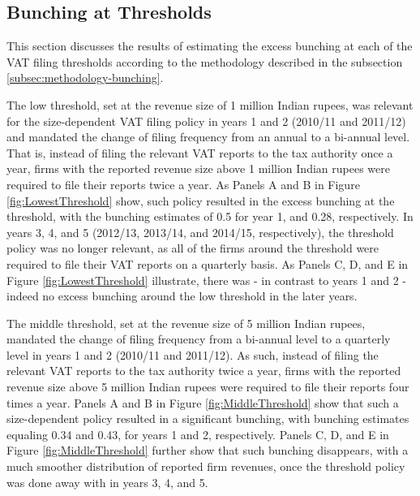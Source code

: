 \subsection{Bunching at Thresholds}
\label{subsec:bunching}
This section discusses the results of estimating the excess bunching
at each of the VAT filing thresholds according to the methodology
described in the subsection \ref{subsec:methodology-bunching}.

The low threshold, set at the revenue size of 1 million Indian rupees,
was relevant for the size-dependent VAT filing policy in years 1 and
2 (2010/11 and 2011/12) and mandated the change of filing frequency
from an annual to a bi-annual level. That is, instead of filing the
relevant VAT reports to the tax authority once a year, firms with
the reported revenue size above 1 million Indian rupees were required
to file their reports twice a year. As Panels A and B in Figure \ref{fig:LowestThreshold}
show, such policy resulted in the excess bunching at the threshold,
with the bunching estimates of 0.5 for year 1, and 0.28, respectively.
In years 3, 4, and 5 (2012/13, 2013/14, and 2014/15, respectively),
the threshold policy was no longer relevant, as all of the firms around
the threshold were required to file their VAT reports on a quarterly
basis. As Panels C, D, and E in Figure \ref{fig:LowestThreshold}
illustrate, there was - in contrast to years 1 and 2 - indeed no excess
bunching around the low threshold in the later years.

The middle threshold, set at the revenue size of 5 million Indian
rupees, mandated the change of filing frequency from a bi-annual level
to a quarterly level in years 1 and 2 (2010/11 and 2011/12). As such,
instead of filing the relevant VAT reports to the tax authority twice
a year, firms with the reported revenue size above 5 million Indian
rupees were required to file their reports four times a year. Panels
A and B in Figure \ref{fig:MiddleThreshold} show that such a size-dependent
policy resulted in a significant bunching, with bunching estimates
equaling 0.34 and 0.43, for years 1 and 2, respectively. Panels C,
D, and E in Figure \ref{fig:MiddleThreshold} further show that such
bunching disappears, with a much smoother distribution of reported
firm revenues, once the threshold policy was done away with in years
3, 4, and 5.

